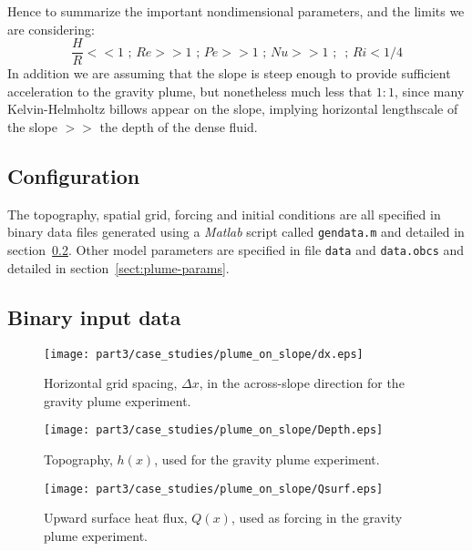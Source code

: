 Hence to summarize the important nondimensional parameters, and 
the limits we are considering:
\begin{equation}
\frac{H}{R} << 1 \mbox{ ; } Re >> 1 \mbox{  ; } Pe >> 1 \mbox{  ; } Nu >> 1
\mbox{  ;  } \mbox{  ; } Ri < 1/4 
\end{equation}
In addition we are assuming that the slope is steep enough to provide 
sufficient acceleration  to the gravity plume, but nonetheless much less 
that $1:1$, since many Kelvin-Helmholtz billows appear on the slope, 
implying horizontal lengthscale of the slope $>>$ the depth of the 
dense fluid. 

\subsection{Configuration}

The topography, spatial grid, forcing and initial conditions are all
specified in binary data files generated using a {\em Matlab} script
called {\tt gendata.m} and detailed in
section~\ref{sect:plume-generating}. Other model parameters are
specified in file {\tt data} and {\tt data.obcs} and detailed in
section~\ref{sect:plume-params}.

\subsection{Binary input data}
\label{sect:plume-generating}

\begin{figure}
\begin{center}
\texttt{[image: part3/case\_studies/plume\_on\_slope/dx.eps]}
\end{center}
\caption{Horizontal grid spacing, $\Delta x$, in the across-slope
direction for the gravity plume experiment.}
\label{fig:dx-plume-on-slope}
\end{figure}

\begin{figure}
\begin{center}
\texttt{[image: part3/case\_studies/plume\_on\_slope/Depth.eps]}
\end{center}
\caption{Topography, $h(x)$, used for the gravity plume experiment.}
\label{fig:depth-plume-on-slope}
\end{figure}

\begin{figure}
\begin{center}
\texttt{[image: part3/case\_studies/plume\_on\_slope/Qsurf.eps]}
\end{center}
\caption{Upward surface heat flux, $Q(x)$, used as forcing in the
gravity plume experiment.}
\label{fig:Q-plume-on-slope}
\end{figure}

